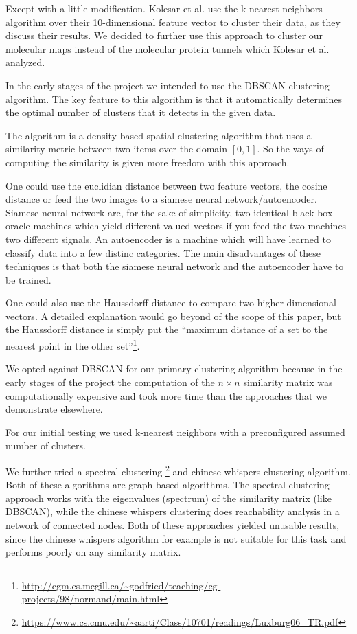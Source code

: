 \documentclass[journal]{vgtc}       %
\begin{document}
Except with a little modification. Kolesar et al. \cite{kolesar} use the k nearest neighbors algorithm over their 10-dimensional feature vector to cluster their data, as they discuss their results. We decided to further use this approach to cluster our molecular maps instead of the molecular protein tunnels which Kolesar et al. analyzed.


In the early stages of the project we intended to use the DBSCAN clustering algorithm. 
The key feature to this algorithm is that it automatically determines the optimal number of clusters that it detects in the given data. 

The algorithm is a density based spatial clustering algorithm that uses a similarity metric between two items  over the domain \([0,1]\). So the ways of computing the similarity is given more freedom with this approach.

One could use the euclidian distance between two feature vectors, the cosine distance or feed the two images to a siamese neural network/autoencoder. Siamese neural network are, for the sake of simplicity, two identical black box oracle machines which yield different valued vectors if you feed the two machines two different signals. An autoencoder is a machine which will have learned to classify data into a few distinc categories. The main disadvantages of these techniques is that both the siamese neural network and the autoencoder have to be trained. 

One could also use the Haussdorff distance to compare two higher dimensional vectors. A detailed explanation would go beyond of the scope of this paper, but the  Haussdorff distance is simply put the ``maximum distance of a set to the nearest point in the other set''\footnote{\url{http://cgm.cs.mcgill.ca/~godfried/teaching/cg-projects/98/normand/main.html}}.

We opted against DBSCAN for our primary clustering algorithm because in the early stages of the project the computation of the \(n\times n\) similarity matrix was  computationally expensive and took more time than the approaches that we demonstrate elsewhere.

For our initial testing we used k-nearest neighbors with a preconfigured assumed number of clusters.

We further tried  a  spectral clustering  \footnote{\url{https://www.cs.cmu.edu/~aarti/Class/10701/readings/Luxburg06_TR.pdf}} and chinese whispers clustering algorithm\cite{chinesewhispers}. Both of these algorithms are graph based algorithms. The spectral clustering approach works with the eigenvalues (spectrum) of the similarity matrix (like DBSCAN), while the chinese whispers clustering does reachability analysis in a network of connected nodes.
Both of these approaches yielded unusable results, since the chinese whispers algorithm for example  is not suitable for this task and performs poorly on any similarity matrix.
\end{document}
